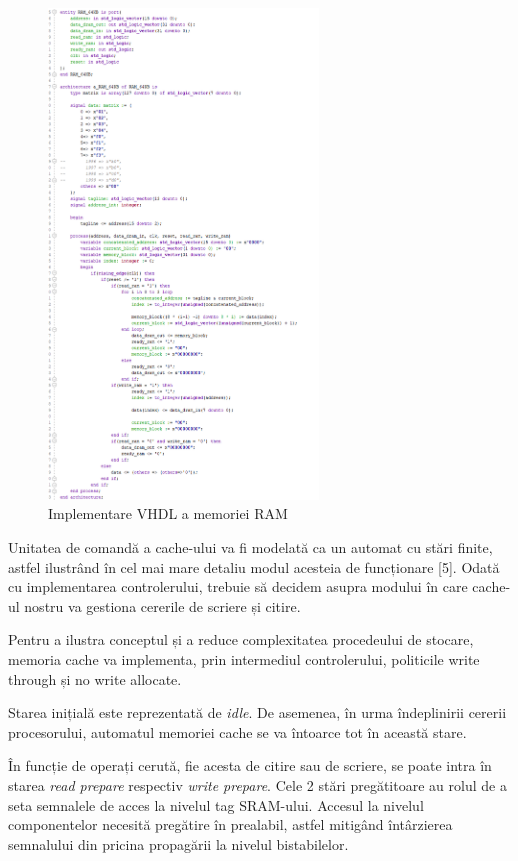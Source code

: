 \documentclass[12pt]{article}
\begin{document}
  \begin{figure}[h!]
 \includegraphics[width=0.64\textwidth]{ram64kb.png}
 \centering
 \caption{Implementare VHDL a memoriei RAM}
 \label{Figura:59}
 \end{figure}

Unitatea de comandă a cache-ului va fi modelată ca un automat cu stări finite, astfel ilustrând în cel mai mare detaliu modul acesteia de funcționare [5]. Odată cu implementarea controlerului, trebuie să decidem asupra modului în care cache-ul nostru va gestiona cererile de scriere și citire.

 Pentru a ilustra conceptul și a reduce complexitatea procedeului de stocare, memoria cache va implementa, prin intermediul controlerului, politicile write through și no write allocate.

Starea inițială este reprezentată de \textit{idle}. De asemenea, în urma îndeplinirii cererii procesorului, automatul memoriei cache se va întoarce tot în această stare.

În funcție de operați cerută, fie acesta de citire sau de scriere, se poate intra în starea \textit{read prepare} respectiv \textit{write prepare}. Cele 2 stări pregătitoare au rolul de a seta semnalele de acces la nivelul tag SRAM-ului. Accesul la nivelul componentelor necesită pregătire în prealabil, astfel mitigând întârzierea semnalului din pricina propagării la nivelul bistabilelor.
\end{document}
